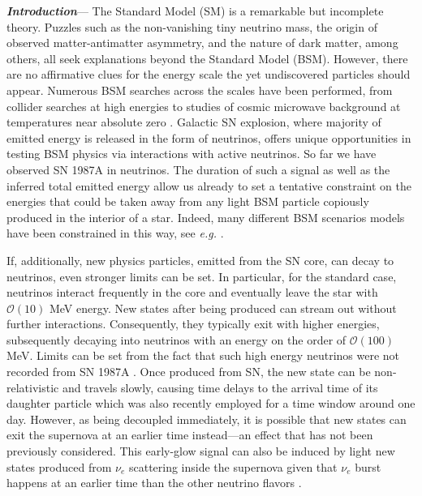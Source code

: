 \textbf{\textit{Introduction}}---
The Standard Model (SM) is a remarkable but incomplete theory. Puzzles such as the non-vanishing tiny neutrino mass, the origin of observed matter-antimatter asymmetry, and the nature of dark matter, among others, all seek explanations beyond the Standard Model (BSM). However, there are no affirmative clues for the energy scale the yet undiscovered particles should appear. Numerous BSM searches across the scales have been performed, from collider searches at high energies \cite{Nath:2010zj} to studies of cosmic microwave background at temperatures near absolute zero \cite{Baumann:2015rya}. Galactic SN explosion, where majority of emitted energy is released in the form of neutrinos, offers unique opportunities in testing BSM physics via interactions with active neutrinos. So far we have observed SN 1987A in neutrinos. The duration of such a signal \cite{Kamiokande-II:1987idp,Bionta:1987qt,Baksan} as well as the inferred total emitted energy \cite{Loredo:2001rx,Pagliaroli:2008ur,Huedepohl2010} allow us already to set a tentative constraint on the energies that could be taken away from any light BSM particle copiously produced in the interior of a star. Indeed, many different BSM scenarios models have been constrained in this way, see \emph{e.g.} \cite{Raffelt:2011nc,Arguelles:2016uwb,Suliga:2020vpz,Lucente:2021hbp,Caputo:2022rca,Caputo:2021rux,PhysRevD.100.083002,DeRocco:2019njg,Kazanas:2014mca,Magill:2018jla}.

If, additionally, new physics particles, emitted from the SN core, can decay to neutrinos, even stronger limits can be set. In particular, for the standard case, neutrinos interact frequently in the core and eventually leave the star with $\mathcal{O}(10)$ MeV energy. New states after being produced can stream out without further interactions. Consequently, they typically exit with higher energies, subsequently decaying into neutrinos with an energy on the order of $\mathcal{O}(100)$ MeV. Limits can be set from the fact that such high energy neutrinos were not recorded from SN 1987A \cite{Kamiokande-II:1987idp,Bionta:1987qt,Baksan, Fiorillo:2022cdq, Brdar:2023tmi}. Once produced from SN, the new state can be non-relativistic and travels slowly, causing time delays to the arrival time of its daughter particle which was also recently employed \cite{Brdar:2023tmi} for a time window around one day. However, as being decoupled immediately, it is possible that new states can exit the supernova at an earlier time instead—an effect that has not been previously considered. This early-glow signal can also be induced by light new states produced from $\nu_e$ scattering inside the supernova given that $\nu_e$ burst happens at an earlier time than the other neutrino flavors \cite{Brdar_2018}. 

